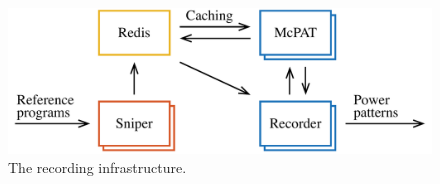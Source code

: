 \begin{figure}
  \centering
  \includegraphics[width=1.0\columnwidth]{include/assets/figures/recorder.pdf}
  \caption{The recording infrastructure.}
\end{figure}
